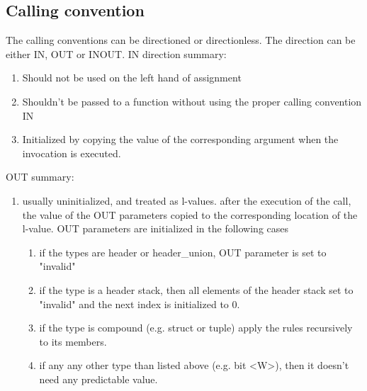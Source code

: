 \documentclass[UTF8]{article}
\begin{document}

\newpage
\subsection{Calling convention}   
The calling conventions can be directioned or directionless. The direction can be either IN, OUT or INOUT. 
IN direction summary:
\begin{enumerate}
\item Should not be used on the left hand of assignment
\item Shouldn't be passed to a function without using the proper calling convention IN
\item Initialized by copying the value of the corresponding argument when the invocation is executed.
\end{enumerate}
OUT summary:
\begin{enumerate}
\item usually uninitialized, and treated as l-values. after the execution of the call, the value of the OUT parameters copied to the corresponding location of the l-value. OUT parameters are initialized in the following cases
\begin{enumerate}[label=(\alph*)]
\item if the types are header or header\_union, OUT parameter is set to "invalid"
\item if the type is a header stack, then all elements of the header stack set to "invalid" and the next index is initialized to 0.
\item if the type is compound (e.g. struct or tuple) apply the rules recursively to its members.
\item if any any other type than listed above (e.g. bit <W>), then it doesn't need any predictable value.
\end{enumerate}
\end{enumerate}
\end{document}
